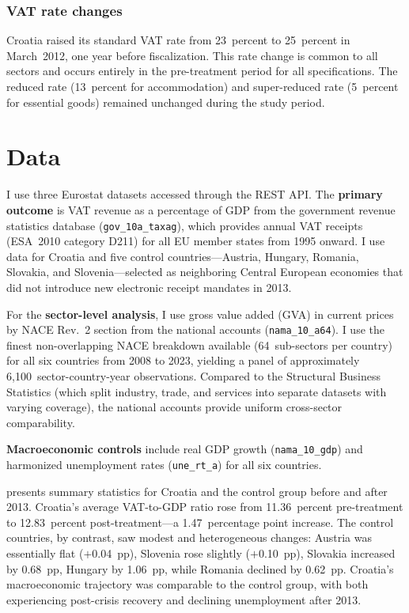 \documentclass[12pt]{article}
\begin{document}
\subsubsection*{VAT rate changes}  Croatia raised its standard VAT rate from 23~percent to 25~percent in March~2012, one year before fiscalization. This rate change is common to all sectors and occurs entirely in the pre-treatment period for all specifications. The reduced rate (13~percent for accommodation) and super-reduced rate (5~percent for essential goods) remained unchanged during the study period.


\section{Data}
\label{sec:data}

I use three Eurostat datasets accessed through the REST API. The \textbf{primary outcome} is VAT revenue as a percentage of GDP from the government revenue statistics database (\texttt{gov\_10a\_taxag}), which provides annual VAT receipts (ESA~2010 category D211) for all EU member states from 1995 onward. I use data for Croatia and five control countries---Austria, Hungary, Romania, Slovakia, and Slovenia---selected as neighboring Central European economies that did not introduce new electronic receipt mandates in 2013.

For the \textbf{sector-level analysis}, I use gross value added (GVA) in current prices by NACE Rev.~2 section from the national accounts (\texttt{nama\_10\_a64}). I use the finest non-overlapping NACE breakdown available (64~sub-sectors per country) for all six countries from 2008 to 2023, yielding a panel of approximately 6,100~sector-country-year observations. Compared to the Structural Business Statistics (which split industry, trade, and services into separate datasets with varying coverage), the national accounts provide uniform cross-sector comparability.

\textbf{Macroeconomic controls} include real GDP growth (\texttt{nama\_10\_gdp}) and harmonized unemployment rates (\texttt{une\_rt\_a}) for all six countries.



 presents summary statistics for Croatia and the control group before and after 2013. Croatia's average VAT-to-GDP ratio rose from 11.36~percent pre-treatment to 12.83~percent post-treatment---a 1.47~percentage point increase. The control countries, by contrast, saw modest and heterogeneous changes: Austria was essentially flat ($+$0.04~pp), Slovenia rose slightly ($+$0.10~pp), Slovakia increased by 0.68~pp, Hungary by 1.06~pp, while Romania declined by 0.62~pp. Croatia's macroeconomic trajectory was comparable to the control group, with both experiencing post-crisis recovery and declining unemployment after 2013.
\end{document}

